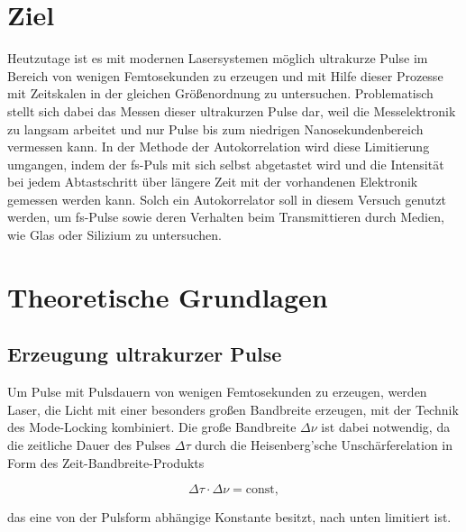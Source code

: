 \section{Ziel}
  Heutzutage ist es mit modernen Lasersystemen möglich ultrakurze Pulse im Bereich von wenigen Femtosekunden zu erzeugen und mit Hilfe dieser Prozesse mit Zeitskalen in der gleichen Größenordnung zu 
  untersuchen. Problematisch stellt sich dabei das Messen dieser ultrakurzen Pulse dar, weil die Messelektronik zu langsam arbeitet und nur Pulse bis zum niedrigen Nanosekundenbereich vermessen kann. In
  der Methode der Autokorrelation wird diese Limitierung umgangen, indem der fs-Puls mit sich selbst abgetastet wird und die Intensität bei jedem Abtastschritt über längere Zeit mit der vorhandenen 
  Elektronik gemessen werden kann. Solch ein Autokorrelator soll in diesem Versuch genutzt werden, um fs-Pulse sowie deren Verhalten beim Transmittieren durch Medien, wie Glas oder Silizium zu untersuchen.
    
\section{Theoretische Grundlagen}

  \subsection{Erzeugung ultrakurzer Pulse}
    Um Pulse mit Pulsdauern von wenigen Femtosekunden zu erzeugen, werden Laser, die Licht mit einer besonders großen Bandbreite erzeugen, mit der Technik des Mode-Locking kombiniert. Die große Bandbreite
    $\Delta\nu$ ist dabei notwendig, da die zeitliche Dauer des Pulses $\Delta\tau$ durch die Heisenberg'sche Unschärferelation in Form des Zeit-Bandbreite-Produkts 
    
    \begin{equation}
      \Delta\tau \cdot \Delta\nu = \text{const},
    \end{equation}
    
    das eine von der Pulsform abhängige Konstante besitzt, nach unten limitiert ist.    


